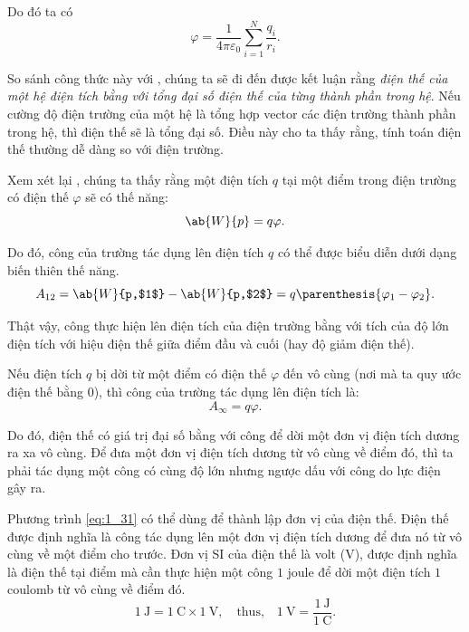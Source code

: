 \noindent
Do đó ta có
\begin{equation}\label{eq:1_28}
	\varphi = \frac{1}{4\pi\varepsilon_0} \sum_{i=1}^N \frac{q_i}{r_{i}}.
\end{equation}

So sánh công thức này với , chúng ta sẽ đi đến được kết luận rằng \textit{điện thế của một hệ điện tích bằng với tổng đại số điện thế của từng thành phần trong hệ}. Nếu cường độ điện trường của một hệ là tổng hợp vector các điện trường thành phần trong hệ, thì điện thế sẽ là tổng đại số. Điều này cho ta thấy rằng, tính toán điện thế thường dễ dàng so với điện trường.

Xem xét lại , chúng ta thấy rằng một điện tích $q$ tại một điểm trong điện trường có điện thế $\varphi$ sẽ có thế năng:
\begin{equation}\label{eq:1_29}
	\ab{W}{p} = q\varphi.
\end{equation}

\noindent
Do đó, công của trường tác dụng lên điện tích $q$ có thể được biểu diễn dưới dạng biến thiên thế năng.
\begin{equation}\label{eq:1_30}
	A_{12} = \ab{W}{p,$1$} - \ab{W}{p,$2$} = q \parenthesis{\varphi_1 - \varphi_2}.
\end{equation}

\noindent
Thật vậy, công thực hiện lên điện tích của điện trường bằng với tích của độ lớn điện tích với hiệu điện thế giữa điểm đầu và cuối (hay độ giảm điện thế).

Nếu điện tích $q$ bị dời từ một điểm có điện thế $\varphi$ đến vô cùng (nơi mà ta quy ước điện thế bằng 0), thì công của trường tác dụng lên điện tích là:
\begin{equation}\label{eq:1_31}
	A_{\infty} = q \varphi.
\end{equation}

\noindent
Do đó, điện thế có giá trị đại số bằng với công để dời một đơn vị điện tích dương ra xa vô cùng. Để đưa một đơn vị điện tích dương từ vô cùng về điểm đó, thì ta phải tác dụng một công có cùng độ lớn nhưng ngược dấu với công do lực điện gây ra.

Phương trình \eqref{eq:1_31} có thể dùng để thành lập đơn vị của điện thế. Điện thế được định nghĩa là công tác dụng lên một đơn vị điện tích dương để đưa nó từ vô cùng về một điểm cho trước. Đơn vị SI của điện thế là volt (\si{\volt}), được định nghĩa là điện thế tại điểm mà cần thực hiện một công $1$ joule để dời một điện tích $1$ coulomb từ vô cùng về điểm đó.
\begin{equation}\label{eq:1_32}
	\SI{1}{\joule} = \SI{1}{\coulomb} \times \SI{1}{\volt},\quad  \text{thus,}\quad \SI{1}{\volt} = \frac{\SI{1}{\joule}}{\SI{1}{\coulomb}}.
\end{equation}

